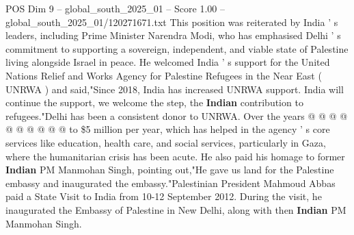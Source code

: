 \begin{textsample}{POS Dim 9 – global\_south\_2025\_01 – Score 1.00 – global\_south\_2025\_01/120271671.txt}
This position was reiterated by India ' s leaders, including Prime Minister Narendra Modi, who has emphasised Delhi ' s commitment to supporting a sovereign, independent, and viable state of Palestine living alongside Israel in peace.
He welcomed India ' s support for the United Nations Relief and Works Agency for Palestine Refugees in the Near East ( UNRWA ) and said,"Since 2018, India has increased UNRWA support.
India will continue the support, we welcome the step, the \textbf{Indian} contribution to refugees."Delhi has been a consistent donor to UNRWA.
Over the years @ @ @ @ @ @ @ @ @ @ to \$5 million per year, which has helped in the agency ' s core services like education, health care, and social services, particularly in Gaza, where the humanitarian crisis has been acute.
He also paid his homage to former \textbf{Indian} PM Manmohan Singh, pointing out,"He gave us land for the Palestine embassy and inaugurated the embassy."Palestinian President Mahmoud Abbas paid a State Visit to India from 10-12 September 2012.
During the visit, he inaugurated the Embassy of Palestine in New Delhi, along with then \textbf{Indian} PM Manmohan Singh.

\end{textsample}
